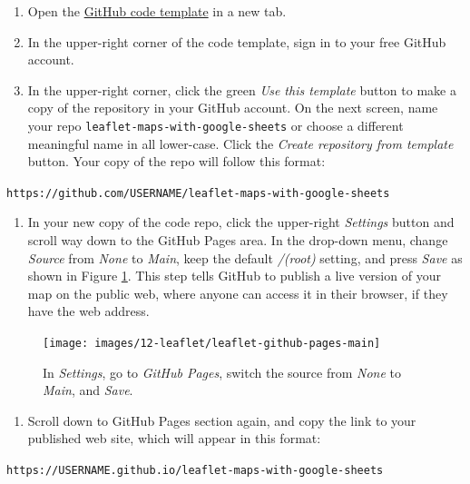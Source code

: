 \documentclass[
  english,
]{book}
\providecommand{\tightlist}{%
  \setlength{\itemsep}{0pt}\setlength{\parskip}{0pt}}
\begin{document}
\begin{enumerate}
\def\labelenumi{\arabic{enumi}.}
\item
  Open the \href{https://github.com/handsondataviz/leaflet-maps-with-google-sheets}{GitHub code template} in a new tab.
\item
  In the upper-right corner of the code template, sign in to your free GitHub account.
\item
  In the upper-right corner, click the green \emph{Use this template} button to make a copy of the repository in your GitHub account. On the next screen, name your repo \texttt{leaflet-maps-with-google-sheets} or choose a different meaningful name in all lower-case. Click the \emph{Create repository from template} button. Your copy of the repo will follow this format:
\end{enumerate}

\texttt{https://github.com/USERNAME/leaflet-maps-with-google-sheets}

\begin{enumerate}
\def\labelenumi{\arabic{enumi}.}
\setcounter{enumi}{3}
\tightlist
\item
  In your new copy of the code repo, click the upper-right \emph{Settings} button and scroll way down to the GitHub Pages area. In the drop-down menu, change \emph{Source} from \emph{None} to \emph{Main}, keep the default \emph{/(root)} setting, and press \emph{Save} as shown in Figure \ref{fig:leaflet-github-pages-main2}. This step tells GitHub to publish a live version of your map on the public web, where anyone can access it in their browser, if they have the web address.
\end{enumerate}



\begin{figure}
\texttt{[image: images/12-leaflet/leaflet-github-pages-main]} \caption{In \emph{Settings}, go to \emph{GitHub Pages}, switch the source from \emph{None} to \emph{Main}, and \emph{Save}.}\label{fig:leaflet-github-pages-main2}
\end{figure}

\begin{enumerate}
\def\labelenumi{\arabic{enumi}.}
\setcounter{enumi}{4}
\tightlist
\item
  Scroll down to GitHub Pages section again, and copy the link to your published web site, which will appear in this format:
\end{enumerate}

\texttt{https://USERNAME.github.io/leaflet-maps-with-google-sheets}
\end{document}
